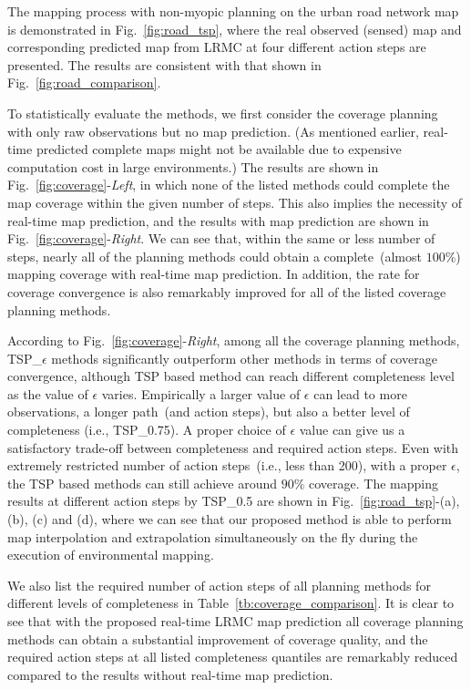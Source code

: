 The mapping process with non-myopic planning on the urban road network map is demonstrated in Fig.~\ref{fig:road_tsp}, where the real observed (sensed) map and corresponding predicted map from LRMC at four different action steps are presented. The results are consistent with that shown in Fig.~\ref{fig:road_comparison}.

To statistically evaluate the methods, we first consider the coverage planning with only raw observations but no map prediction. (As mentioned earlier, real-time predicted complete maps might not be available due to expensive computation cost in large environments.) The results are shown in Fig.~\ref{fig:coverage}-\textit{Left}, in which none of the listed methods could complete the map coverage within the given number of steps.
This also implies the necessity of real-time map prediction, 
and the results with map prediction are shown in Fig.~\ref{fig:coverage}-\textit{Right}. 
We can see that, 
within the same or less number of steps, nearly all of the planning methods could obtain a complete~(almost $100\%$) mapping coverage with real-time map prediction. 
In addition, the rate for coverage convergence is also remarkably improved for all of the listed coverage planning methods.

According to Fig.~\ref{fig:coverage}-\textit{Right}, among all the coverage planning methods, TSP\_$\epsilon$ methods significantly outperform other methods in terms of coverage convergence, although TSP based method can reach different completeness level as the value of $\epsilon$ varies. 
Empirically a larger value of $\epsilon$ can lead to more observations, a longer path~(and action steps), but also a better level of completeness (i.e., TSP\_{0.75}). A proper choice of $\epsilon$ value can give us a satisfactory trade-off between completeness and required action steps. 
Even with extremely restricted number of action steps~(i.e., less than 200), with a proper $\epsilon$, the TSP based methods can still achieve around $90\%$ coverage. The mapping results at different action steps by TSP\_{0.5} are shown in Fig.~\ref{fig:road_tsp}-(a), (b), (c) and (d), where we can see that our proposed method is able to perform map interpolation and extrapolation simultaneously on the fly during the execution of environmental mapping.

We also list the required number of action steps of all planning methods for different levels of completeness in Table~\ref{tb:coverage_comparison}. It is clear to see that with the proposed real-time LRMC map prediction all coverage planning methods can obtain a substantial improvement of coverage quality, and the required action steps at all listed completeness quantiles are remarkably reduced compared to the results without real-time map prediction.

